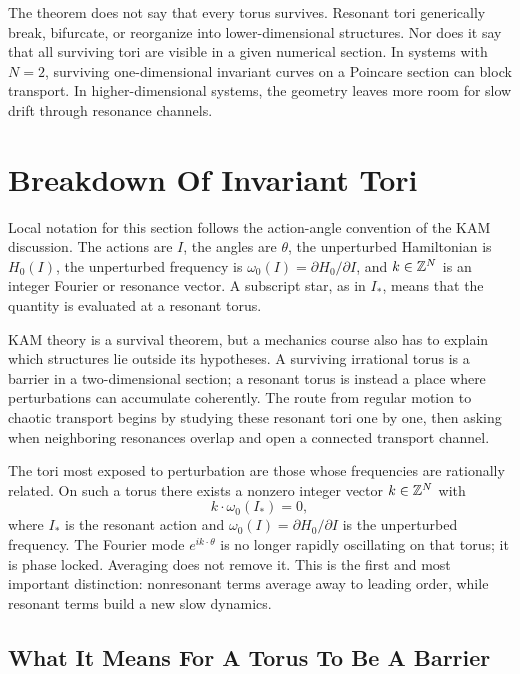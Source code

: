 The theorem does not say that every torus survives. Resonant tori generically
break, bifurcate, or reorganize into lower-dimensional structures. Nor does it say that all
surviving tori are visible in a given numerical section. In systems with
\(N=2\), surviving
one-dimensional invariant curves on a Poincare section can block transport. In
higher-dimensional systems, the geometry leaves more room for slow drift
through resonance channels.

\section{Breakdown Of Invariant Tori}
\label{sec:breakdown-invariant-tori}

Local notation for this section follows the action-angle convention of the
KAM discussion.  The actions are \(I\), the angles are \(\theta\), the
unperturbed Hamiltonian is \(H_0(I)\), the unperturbed frequency is
\(\omega_0(I)=\partial H_0/\partial I\), and \(k\in\mathbb{Z}^N\) is an integer
Fourier or resonance vector.  A subscript star, as in \(I_*\), means that the
quantity is evaluated at a resonant torus.

KAM theory is a survival theorem, but a mechanics course also has to explain
which structures lie outside its hypotheses. A surviving irrational torus is a
barrier in a two-dimensional section; a resonant torus is instead a place where
perturbations can accumulate coherently. The route from regular motion to
chaotic transport begins by studying these resonant tori one by one, then
asking when neighboring resonances overlap and open a connected transport
channel.

The tori most exposed to perturbation are those whose frequencies are
rationally related. On such a torus there exists a nonzero integer vector
\(k\in\mathbb{Z}^N\) with
\[
  k\cdot\omega_0(I_*)=0,
\]
where \(I_*\) is the resonant action and \(\omega_0(I)=\partial H_0/\partial I\)
is the unperturbed frequency. The Fourier mode \(e^{ik\cdot\theta}\) is no
longer rapidly oscillating on that torus; it is phase locked. Averaging does
not remove it. This is the first and most important distinction:
nonresonant terms average away to leading order, while resonant terms build a
new slow dynamics.

\subsection{What It Means For A Torus To Be A Barrier}
\label{subsec:torus-barrier}

